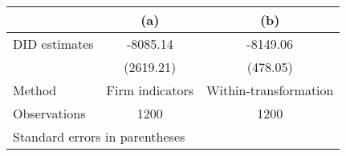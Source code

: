 \begin{tabular}{l*{2}{c}}
\hline\hline
                    &\multicolumn{1}{c}{(a)}&\multicolumn{1}{c}{(b)}\\
\hline
DID estimates       &    -8085.14&    -8149.06\\
                    &   (2619.21)&    (478.05)\\
\hline
Method              &Firm indicators&Within-transformation\\
Observations        &        1200&        1200\\
\hline\hline
\multicolumn{3}{l}{\footnotesize Standard errors in parentheses}\\
\end{tabular}
